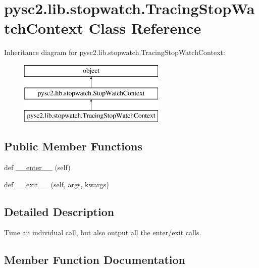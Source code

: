 \hypertarget{classpysc2_1_1lib_1_1stopwatch_1_1_tracing_stop_watch_context}{}\section{pysc2.\+lib.\+stopwatch.\+Tracing\+Stop\+Watch\+Context Class Reference}
\label{classpysc2_1_1lib_1_1stopwatch_1_1_tracing_stop_watch_context}
Inheritance diagram for pysc2.\+lib.\+stopwatch.\+Tracing\+Stop\+Watch\+Context\+:\begin{figure}[H]
\begin{center}
\leavevmode
\includegraphics[height=3.000000cm]{classpysc2_1_1lib_1_1stopwatch_1_1_tracing_stop_watch_context}
\end{center}
\end{figure}
\subsection*{Public Member Functions}
\begin{DoxyCompactItemize}
\item 
def \mbox{\hyperlink{classpysc2_1_1lib_1_1stopwatch_1_1_tracing_stop_watch_context_a96c77e38100ba8407a72cb39c2db9ae7}{\+\_\+\+\_\+enter\+\_\+\+\_\+}} (self)
\item 
def \mbox{\hyperlink{classpysc2_1_1lib_1_1stopwatch_1_1_tracing_stop_watch_context_a41722e8b20fbdde29145c764e8bee690}{\+\_\+\+\_\+exit\+\_\+\+\_\+}} (self, args, kwargs)
\end{DoxyCompactItemize}


\subsection{Detailed Description}
\begin{DoxyVerb}Time an individual call, but also output all the enter/exit calls.\end{DoxyVerb}
 

\subsection{Member Function Documentation}
\mbox{\label{classpysc2_1_1lib_1_1stopwatch_1_1_tracing_stop_watch_context_a96c77e38100ba8407a72cb39c2db9ae7}} 
